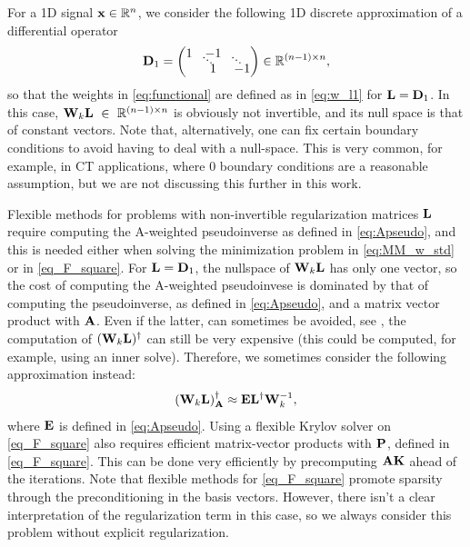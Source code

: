 \documentclass[11pt]{article}
\numberwithin{equation}{section}
\newcommand{\fddots}{\mathinner{
  \raise5pt\hbox{.}\raise3pt\hbox{.}\raise1pt\hbox{.}
}}
\newcommand{\bfA}{{\bf A}}
\newcommand{\bfD}{{\bf D}}
\newcommand{\bfE}{{\bf E}}
\newcommand{\bfK}{{\bf K}}
\newcommand{\bfL}{{\bf L}}
\newcommand{\bfP}{{\bf P}}
\newcommand{\bfW}{{\bf W}}
\newcommand{\bfx}{{\bf x}}
\begin{document}
For a 1D signal $\bfx\in\mathbb{R}^{n}$, we consider the following 1D discrete approximation of a
differential operator
\begin{equation}\label{1DD}
\bfD_1 = \begin{pmatrix}
1 & -1  &\\[-6pt]   %
&\hspace{-9pt}\fddots&\hspace{-9pt}\fddots \\[-6pt]   %
 & 1 & -1
\end{pmatrix} \in \mathbb{R}^{(n-1) \times n},
\end{equation}
so that the weights in \eqref{eq:functional} are defined as in \eqref{eq:w_l1} for $\bfL=\bfD_1$. In this case, $\bfW_k \bfL~\in~\mathbb{R}^{(n-1)\times n}$ is obviously not invertible, and its null space is that of constant vectors. Note that, alternatively, one can fix certain boundary conditions to avoid having to deal with a null-space. This is very common, for example, in CT applications, where 0 boundary conditions are a reasonable assumption, but we are not discussing this further in this work.  

Flexible methods for problems with non-invertible regularization matrices $\bfL$ require computing the A-weighted pseudoinverse as defined in \eqref{eq:Apseudo}, and this is needed either when solving the minimization problem in \eqref{eq:MM_w_std} or in \eqref{eq_F_square}. For $\bfL=\bfD_1$, the nullspace of $\bfW_k\bfL$ has only one vector, so the cost of computing the A-weighted pseudoinvese is dominated by that of computing the pseudoinverse, as defined in \eqref{eq:Apseudo}, and a matrix vector product with $\bfA$. Even if the latter, can sometimes be avoided, see \cite{Sabate2019TV}, the computation of $(\bfW_k\bfL)^{\dagger}$ can still be very expensive (this could be computed, for example, using an inner solve). Therefore, we sometimes consider the following approximation instead:
\begin{equation}\label{Apseudo_approx}
(\bfW_k\bfL)^{\dagger}_{\bfA} \approx \bfE \bfL^{\dagger} \bfW_k^{-1},
\end{equation}
where $\bfE$ is defined in \eqref{eq:Apseudo}. Using a flexible Krylov solver on \eqref{eq_F_square} also requires efficient matrix-vector products with $\bfP$, defined in \eqref{eq_F_square}. This can be done very efficiently by precomputing $\bfA\bfK$ ahead of the iterations. Note that flexible methods for \eqref{eq_F_square} promote sparsity through the preconditioning in the basis vectors. However, there isn't a clear interpretation of the regularization term in this case, so we always consider this problem without explicit regularization. 
\end{document}
